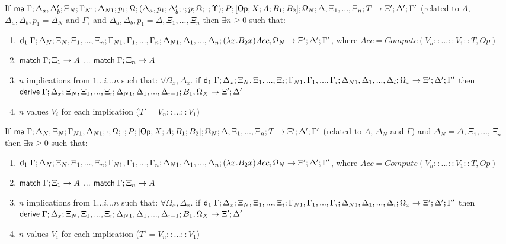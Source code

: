 \begin{theorem}
   If $\mathsf{ma} \; \Gamma; \Delta_a, \Delta'_b; \Xi_N; \Gamma_{N1}; \Delta_{N1}; p_1; \Omega; (\Delta_a, p_1; \Delta'_b; \cdot; p; \Omega; \cdot; \Upsilon); P; [\mathsf{Op} ; X ; A ; B_1; B_2]; \Omega_N; \Delta, \Xi_1, ..., \Xi_n; T \rightarrow \Xi'; \Delta'; \Gamma'$ (related to $A$, $\Delta_a, \Delta_b, p_1 = \Delta_N$ and $\Gamma$) and $\Delta_a, \Delta_b, p_1 = \Delta, \Xi_1, ..., \Xi_n$  then $\exists n \geq 0$ such that:
   
   \begin{enumerate}
      \item $\mathsf{d}_1 \; \Gamma; \Delta_N; \Xi_N, \Xi_1, ..., \Xi_n; \Gamma_{N1}, \Gamma_1, ..., \Gamma_n; \Delta_{N1}, \Delta_1, ..., \Delta_n; (\lambda x. B_2 x)Acc, \Omega_N \rightarrow \Xi'; \Delta'; \Gamma'$, where $Acc = Compute(V_n :: ... :: V_1 :: T, Op)$
      \item $\mathsf{match} \; \Gamma; \Xi_1 \rightarrow A$ ... $\mathsf{match} \; \Gamma; \Xi_n \rightarrow A$
      \item $n$ implications from $1...i...n$ such that: $\forall \Omega_x, \Delta_x.$ if $\mathsf{d}_1 \; \Gamma; \Delta_x; \Xi_N, \Xi_1, ..., \Xi_i; \Gamma_{N1}, \Gamma_1, ..., \Gamma_i; \Delta_{N1}, \Delta_1, ..., \Delta_i; \Omega_x \rightarrow \Xi'; \Delta'; \Gamma'$ then $\mathsf{derive} \; \Gamma; \Delta_x; \Xi_N, \Xi_1, ..., \Xi_i; \Delta_{N1}, \Delta_1, ..., \Delta_{i-1}; B_1, \Omega_X \rightarrow \Xi'; \Delta'$
      \item $n$ values $V_i$ for each implication ($T' = V_n :: ... :: V_1$)
   \end{enumerate}
   
   If $\mathsf{ma} \; \Gamma; \Delta_N; \Xi_N; \Gamma_{N1}; \Delta_{N1}; \cdot; \Omega; \cdot; P; [\mathsf{Op} ; X ; A ; B_1; B_2]; \Omega_N; \Delta, \Xi_1, ..., \Xi_n; T \rightarrow \Xi'; \Delta'; \Gamma'$ (related to $A$, $\Delta_N$ and $\Gamma$) and $\Delta_N = \Delta, \Xi_1, ..., \Xi_n$ then $\exists n \geq 0$ such that:
   
   \begin{enumerate}
      \item $\mathsf{d}_1 \; \Gamma; \Delta_N; \Xi_N, \Xi_1, ..., \Xi_n; \Gamma_{N1}, \Gamma_1, ..., \Gamma_n; \Delta_{N1}, \Delta_1, ..., \Delta_n; (\lambda x. B_2 x)Acc, \Omega_N \rightarrow \Xi'; \Delta'; \Gamma'$, where $Acc = Compute(V_n :: ... :: V_1 :: T, Op)$
      \item $\mathsf{match} \; \Gamma; \Xi_1 \rightarrow A$ ... $\mathsf{match} \; \Gamma; \Xi_n \rightarrow A$
      \item $n$ implications from $1...i...n$ such that: $\forall \Omega_x, \Delta_x.$ if $\mathsf{d}_1 \; \Gamma; \Delta_x; \Xi_N, \Xi_1, ..., \Xi_i; \Gamma_{N1}, \Gamma_1, ..., \Gamma_i; \Delta_{N1}, \Delta_1, ..., \Delta_i; \Omega_x \rightarrow \Xi'; \Delta'; \Gamma'$ then $\mathsf{derive} \; \Gamma; \Delta_x; \Xi_N, \Xi_1, ..., \Xi_i; \Delta_{N1}, \Delta_1, ..., \Delta_{i-1}; B_1, \Omega_X \rightarrow \Xi'; \Delta'$
      \item $n$ values $V_i$ for each implication ($T' = V_n :: ... :: V_1$)
   \end{enumerate}
\end{theorem}

